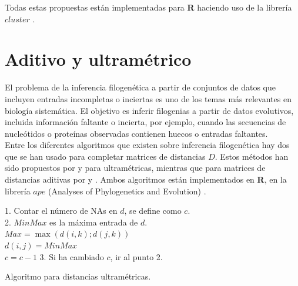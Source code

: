 \documentclass[12pt]{report} %
\theoremstyle{definition}
\begin{document}
{Todas estas propuestas están implementadas para \textbf{\textsf{R}} haciendo uso de la librería $cluster$ \cite{cluster}.

\section{Aditivo y ultramétrico}

El problema de la inferencia filogenética a partir de conjuntos de datos que incluyen entradas incompletas o inciertas es uno de los temas más relevantes en biología sistemática.\cite{phylogenies} El objetivo es inferir filogenias a partir de datos evolutivos, incluida información faltante o incierta, por ejemplo, cuando las secuencias de nucleótidos o proteínas observadas contienen huecos o entradas faltantes.\\

Entre los diferentes algoritmos que existen sobre inferencia filogenética hay dos que se han usado para completar matrices de distancias $D$. Estos métodos han sido propuestos por \cite{DeSoete1984} y \cite{Lapointe} para ultramétricas, mientras que para matrices de distancias aditivas por \cite{Landry1996} y \cite{LandryLapointe}. Ambos algoritmos están implementados en \textbf{\textsf{R}}, en la librería $ape$ (Analyses of Phylogenetics and Evolution) \cite{ape}.\\

\begin{algorithm}[H] 
	\SetAlgoLined
	1. Contar el número de NAs en $d$, se define como $c$.\\
	2. 
	{
		$MinMax$ es la máxima entrada de $d$.\\
		{
			$Max = \max(d(i,k);d(j,k))$\\
		}
	{$d(i,j) = MinMax$\\
	$c = c-1$}
	}
	3. Si ha cambiado $c$, ir al punto 2.
	\caption{Algoritmo para distancias ultramétricas.}
\end{algorithm}
\vspace{0.5cm}

}
\end{document}

